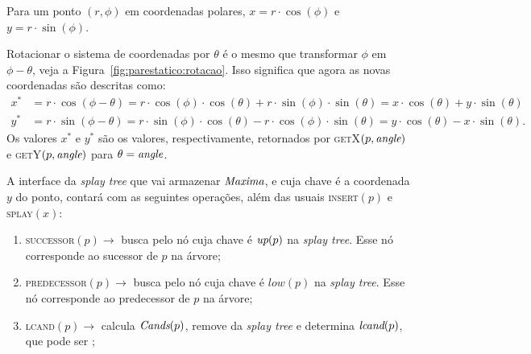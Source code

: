 Para um ponto $(r, \phi)$ em coordenadas polares, $x = r\cdot \cos{(\phi)}$ e $y = r\cdot
\sin{(\phi)}$.

Rotacionar o sistema de coordenadas por $\theta$ é o mesmo que transformar $\phi$ em $\phi -
\theta$, veja a Figura~\ref{fig:parestatico:rotacao}.
Isso significa que agora as novas coordenadas são descritas como:
\begin{align*}
    x^* & = r\cdot \cos{(\phi - \theta)}= r\cdot \cos{(\phi)}\cdot \cos{(\theta)}
    + r\cdot \sin{(\phi)}\cdot \sin{(\theta)} = x\cdot \cos{(\theta)} + y\cdot \sin{(\theta)} \\
    y^* & = r\cdot \sin{(\phi - \theta)} = r\cdot \sin{(\phi)}\cdot \cos{(\theta)}
    - r\cdot \cos{(\phi)}\cdot \sin{(\theta)} = y\cdot \cos{(\theta)} - x\cdot \sin{(\theta)}.
\end{align*}
Os valores $x^*$ e $y^*$ são os valores, respectivamente, retornados por \textsc{getX}$(p,
\textit{angle})$ e \textsc{getY}$(p, \textit{angle})$ para $\theta = \textit{angle}$.



A interface da \textit{splay tree} que vai armazenar $\textit{Maxima}$, e cuja chave é a coordenada $y$ do
ponto, contará com as seguintes operações, além das usuais \textsc{insert}$(p)$ e
\textsc{splay}$(x)$:
\begin{enumerate}
    \item \textsc{successor}$(p) \rightarrow$ busca pelo nó
    cuja chave é $\textit{up}(p)$ na \textit{splay tree}.
    Esse nó corresponde ao sucessor de $p$ na árvore;
    \item \textsc{predecessor}$(p) \rightarrow$ busca pelo nó cuja chave é $low(p)$ na \textit{splay tree}.
    Esse nó corresponde ao predecessor de $p$ na árvore;
    \item \textsc{lcand}$(p) \rightarrow$ calcula $\textit{Cands}(p)$, remove da
    \textit{splay tree} e determina $\textit{lcand}(p)$, que pode ser \nnull;
\end{enumerate}


